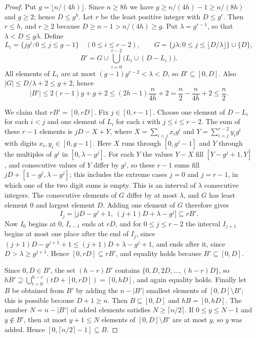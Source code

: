 \documentclass[11pt]{amsart}
\theoremstyle{definition}
\theoremstyle{remark}
\numberwithin{equation}{section}
\begin{document}
\begin{proof}
Put $g=\lfloor n/(4h)\rfloor$. Since $n\ge 8h$ we have $g\ge n/(4h)-1\ge n/(8h)$ and $g\ge 2$; hence $D\le g^h$. Let $r$ be the least positive integer with $D\le g^r$. Then $r\le h$, and $r\ge 2$ because $D\ge n-1>n/(4h)\ge g$. Put $\lambda=g^{r-1}$, so that $\lambda<D\le g\lambda$. Define
\[
L_i=\{jg^i:0\le j\le g-1\}\quad(0\le i\le r-2),\qquad G=\{j\lambda:0\le j\le\lfloor D/\lambda\rfloor\}\cup\{D\},
\]
\[
B'=G\cup\bigcup_{i=0}^{r-2}\bigl(L_i\cup(D-L_i)\bigr).
\]
All elements of $L_i$ are at most $(g-1)g^{r-2}<\lambda<D$, so $B'\subseteq[0,D]$. Also $|G|\le D/\lambda+2\le g+2$, hence
\[
|B'|\le 2(r-1)g+g+2\le(2h-1)\frac{n}{4h}+2=\frac n2-\frac{n}{4h}+2\le\frac n2.
\]

We claim that $rB'=[0,rD]$. Fix $j\in[0,r-1]$. Choose one element of $D-L_i$ for each $i<j$ and one element of $L_i$ for each $i$ with $j\le i\le r-2$. The sum of these $r-1$ elements is $jD-X+Y$, where $X=\sum_{i<j}x_ig^i$ and $Y=\sum_{i=j}^{r-2}y_ig^i$ with digits $x_i,y_i\in[0,g-1]$. Here $X$ runs through $[0,g^j-1]$ and $Y$ through the multiples of $g^j$ in $[0,\lambda-g^j]$. For each $Y$ the values $Y-X$ fill $[Y-g^j+1,Y]$, and consecutive values of $Y$ differ by $g^j$, so these $r-1$ sums fill $jD+[1-g^j,\lambda-g^j]$; this includes the extreme cases $j=0$ and $j=r-1$, in which one of the two digit sums is empty. This is an interval of $\lambda$ consecutive integers. The consecutive elements of $G$ differ by at most $\lambda$, and $G$ has least element $0$ and largest element $D$. Adding one element of $G$ therefore gives
\[
I_j=\bigl[jD-g^j+1,\ (j+1)D+\lambda-g^j\bigr]\subseteq rB'.
\]
Now $I_0$ begins at $0$, $I_{r-1}$ ends at $rD$, and for $0\le j\le r-2$ the interval $I_{j+1}$ begins at most one place after the end of $I_j$, since $(j+1)D-g^{j+1}+1\le(j+1)D+\lambda-g^j+1$, and ends after it, since $D>\lambda\ge g^{j+1}$. Hence $[0,rD]\subseteq rB'$, and equality holds because $B'\subseteq[0,D]$.

Since $0,D\in B'$, the set $(h-r)B'$ contains $\{0,D,2D,\dots,(h-r)D\}$, so $hB'\supseteq\bigcup_{t=0}^{h-r}(tD+[0,rD])=[0,hD]$, and again equality holds. Finally let $B$ be obtained from $B'$ by adding the $n-|B'|$ smallest elements of $[0,D]\setminus B'$; this is possible because $D+1\ge n$. Then $B\subseteq[0,D]$ and $hB=[0,hD]$. The number $N=n-|B'|$ of added elements satisfies $N\ge\lceil n/2\rceil$. If $0\le y\le N-1$ and $y\notin B'$, then at most $y+1\le N$ elements of $[0,D]\setminus B'$ are at most $y$, so $y$ was added. Hence $[0,\lceil n/2\rceil-1]\subseteq B$.
\end{proof}
\end{document}
